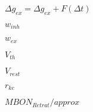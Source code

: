 $\Delta g_{ex} = \Delta g_{ex} + F(\Delta t)$

$w_{inh}$

$w_{ex}$

$V_{th}$

$V_{rest}$

$r_{kc}$

$MBON_{Retrat} /approx $
